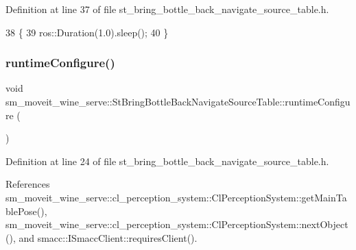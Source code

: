 Definition at line 37 of file st\+\_\+bring\+\_\+bottle\+\_\+back\+\_\+navigate\+\_\+source\+\_\+table.\+h.


\begin{DoxyCode}
38         \{
39             ros::Duration(1.0).sleep();
40         \}
\end{DoxyCode}
\mbox{\label{structsm__moveit__wine__serve_1_1StBringBottleBackNavigateSourceTable_a0cbda5ab701077cacaf4ff8b167287ff}} 
\subsubsection{\texorpdfstring{runtime\+Configure()}{runtimeConfigure()}}
{\footnotesize\ttfamily void sm\+\_\+moveit\+\_\+wine\+\_\+serve\+::\+St\+Bring\+Bottle\+Back\+Navigate\+Source\+Table\+::runtime\+Configure (\begin{DoxyParamCaption}{ }\end{DoxyParamCaption})\hspace{0.3cm}{\ttfamily [inline]}}



Definition at line 24 of file st\+\_\+bring\+\_\+bottle\+\_\+back\+\_\+navigate\+\_\+source\+\_\+table.\+h.



References sm\+\_\+moveit\+\_\+wine\+\_\+serve\+::cl\+\_\+perception\+\_\+system\+::\+Cl\+Perception\+System\+::get\+Main\+Table\+Pose(), sm\+\_\+moveit\+\_\+wine\+\_\+serve\+::cl\+\_\+perception\+\_\+system\+::\+Cl\+Perception\+System\+::next\+Object(), and smacc\+::\+I\+Smacc\+Client\+::requires\+Client().


